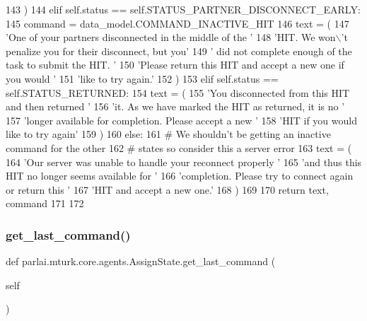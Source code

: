 \begin{DoxyCode}
143             )
144         \textcolor{keywordflow}{elif} self.status == self.STATUS\_PARTNER\_DISCONNECT\_EARLY:
145             command = data\_model.COMMAND\_INACTIVE\_HIT
146             text = (
147                 \textcolor{stringliteral}{'One of your partners disconnected in the middle of the '}
148                 \textcolor{stringliteral}{'HIT. We won\(\backslash\)'t penalize you for their disconnect, but you'}
149                 \textcolor{stringliteral}{' did not complete enough of the task to submit the HIT. '}
150                 \textcolor{stringliteral}{'Please return this HIT and accept a new one if you would '}
151                 \textcolor{stringliteral}{'like to try again.'}
152             )
153         \textcolor{keywordflow}{elif} self.status == self.STATUS\_RETURNED:
154             text = (
155                 \textcolor{stringliteral}{'You disconnected from this HIT and then returned '}
156                 \textcolor{stringliteral}{'it. As we have marked the HIT as returned, it is no '}
157                 \textcolor{stringliteral}{'longer available for completion. Please accept a new '}
158                 \textcolor{stringliteral}{'HIT if you would like to try again'}
159             )
160         \textcolor{keywordflow}{else}:
161             \textcolor{comment}{# We shouldn't be getting an inactive command for the other}
162             \textcolor{comment}{# states so consider this a server error}
163             text = (
164                 \textcolor{stringliteral}{'Our server was unable to handle your reconnect properly '}
165                 \textcolor{stringliteral}{'and thus this HIT no longer seems available for '}
166                 \textcolor{stringliteral}{'completion. Please try to connect again or return this '}
167                 \textcolor{stringliteral}{'HIT and accept a new one.'}
168             )
169 
170         \textcolor{keywordflow}{return} text, command
171 
172 
\end{DoxyCode}
\mbox{\label{classparlai_1_1mturk_1_1core_1_1agents_1_1AssignState_a50b030308201e7e8e91292ec2419400b}} 
\subsubsection{\texorpdfstring{get\+\_\+last\+\_\+command()}{get\_last\_command()}}
{\footnotesize\ttfamily def parlai.\+mturk.\+core.\+agents.\+Assign\+State.\+get\+\_\+last\+\_\+command (\begin{DoxyParamCaption}\item[{}]{self }\end{DoxyParamCaption})}



